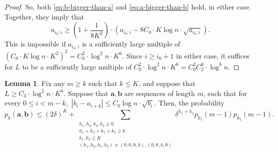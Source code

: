 \documentclass[12pt]{article}
\theoremstyle{definition}
\newtheorem{lemma}[theorem]{Lemma}
\theoremstyle{remark}
\newcommand{\ba}{\mathbf a}
\newcommand{\bb}{\mathbf b}
\begin{document}
\begin{proof}
    So, both \eqref{eq:b-bigger-than-a} and \eqref{eq:a-bigger-than-b} hold, in either case. Together, they imply that
\[a_{i_0:i} \ge \left(1+\frac{1}{8K^2}\right) \cdot \left(a_{i_0:i} - 8C_0 \cdot K \log n \cdot \sqrt{a_{i_0:i}}\right).\]
    This is impossible if $a_{i_0:i}$ is a sufficiently large multiple of $(C_0 \cdot K \log n \cdot K^2)^2 = C_0^2 \cdot \log^2 n \cdot K^6$. Since $i \ge i_0+1$ in either case, it suffices for $L$ to be a sufficiently large multiple of $C_0^2 \cdot \log^2 n \cdot K^6 = C_0^2 C_2^6 \cdot \log^8 n$.
\end{proof}

\begin{lemma} \label{lem:half-periodic-bound}
    Fix any $m \ge k$ such that $k \le K$, and suppose that $L \ge C_3 \cdot \log^2 n \cdot K^6$. Suppose that $\ba, \bb$ are sequences of length $m$, such that for every $0 \le i < m-k,$ $|b_i-a_{i+k}| \le C_0 \log n \cdot \sqrt{b_i}$.
    Then, the probability
\[p_k(\ba, \bb) \le (2\delta)^{K} + \sum_{\substack{h_1, h_2, k_2, k_2 \ge 0 \\ h_1+h_2+k_1+k_2 \ge k \\ k_1, k_2 \le K \\ (h_1, h_2, k_1, k_2) \neq (0, 0, 0, k), (0, 0, k, 0)}} \delta^{h_1+h_2} p_{k_1}(m-1) p_{k_2}(m-1).\]
\end{lemma}
\end{document}
